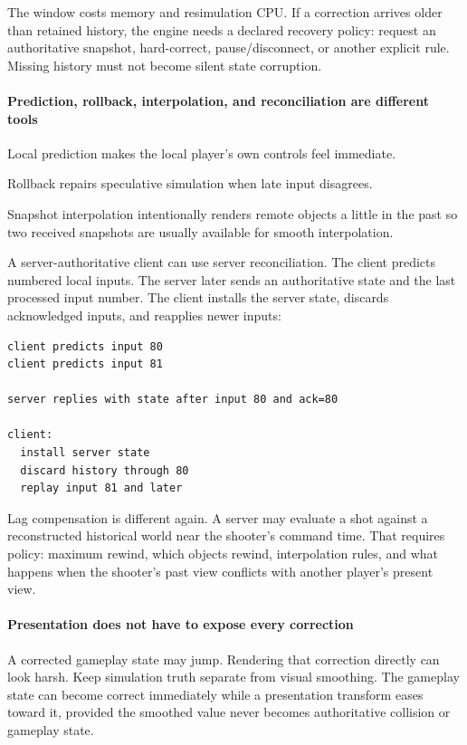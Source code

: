 The window costs memory and resimulation CPU. If a correction arrives older than retained history, the engine needs a declared recovery policy: request an authoritative snapshot, hard-correct, pause/disconnect, or another explicit rule. Missing history must not become silent state corruption.

\paragraph{Prediction, rollback, interpolation, and reconciliation are different tools}\label{prediction-rollback-interpolation-and-reconciliation-are-different-tools}

Local prediction makes the local player's own controls feel immediate.

Rollback repairs speculative simulation when late input disagrees.

Snapshot interpolation intentionally renders remote objects a little in the past so two received snapshots are usually available for smooth interpolation.

A server-authoritative client can use server reconciliation. The client predicts numbered local inputs. The server later sends an authoritative state and the last processed input number. The client installs the server state, discards acknowledged inputs, and reapplies newer inputs:

\begin{verbatim}
client predicts input 80
client predicts input 81

server replies with state after input 80 and ack=80

client:
  install server state
  discard history through 80
  replay input 81 and later
\end{verbatim}

Lag compensation is different again. A server may evaluate a shot against a reconstructed historical world near the shooter's command time. That requires policy: maximum rewind, which objects rewind, interpolation rules, and what happens when the shooter's past view conflicts with another player's present view.

\paragraph{Presentation does not have to expose every correction}\label{presentation-does-not-have-to-expose-every-correction}

A corrected gameplay state may jump. Rendering that correction directly can look harsh. Keep simulation truth separate from visual smoothing. The gameplay state can become correct immediately while a presentation transform eases toward it, provided the smoothed value never becomes authoritative collision or gameplay state.

